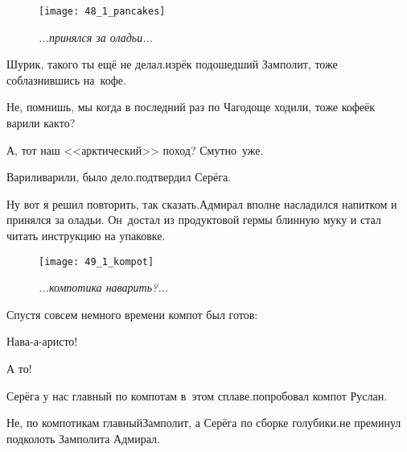 \newpage

\begin{wrapfigure}[20]{r}{0.58\textwidth}
	\centering
	\texttt{[image: 48\_1\_pancakes]}
	\caption{\small\textit{...принялся за оладьи...}}
\end{wrapfigure}
\diagdash Шурик, такого ты ещё не делал.\mdash изрёк подошедший Замполит, тоже соблазнившись на~кофе.

\diagdash Не, помнишь, мы когда в последний раз по Чагодоще ходили, тоже кофеёк варили как\sdash то?

\diagdash А, тот наш <<арктический>> поход? Смутно~уже.

\diagdash Варили\sdash варили, было дело.\mdash подтвердил Серёга.

\diagdash Ну вот я решил повторить, так сказать.\mdash Адмирал вполне насладился напитком и принялся за оладьи. Он~достал из продуктовой гермы блинную муку и стал читать инструкцию на упаковке.


\newpage

\begin{wrapfigure}[10]{r}{0.5\textwidth}
	\centering
	\texttt{[image: 49\_1\_kompot]}
	\caption{\small\textit{...компотика наварить?...}}
\end{wrapfigure}

Спустя совсем немного времени компот был готов:

\diagdash Нава-а-аристо!

\diagdash А то!

\diagdash Серёга у нас главный по компотам в~этом сплаве.\mdash попробовал компот Руслан.

\diagdash Не, по компотикам главный\mdash Замполит, а Серёга по сборке голубики.\mdash не преминул подколоть Замполита Адмирал.

\newpage

